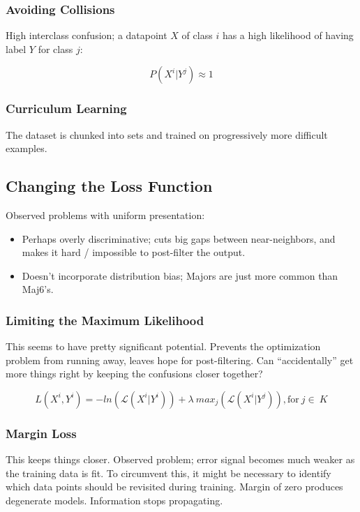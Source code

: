 \subsubsection{Avoiding Collisions}

High interclass confusion; a datapoint $X$ of class $i$ has a high likelihood of having label $Y$ for class $j$:

\begin{equation}
P(X^i | Y^j) \approx 1
\label{eq:collisions}
\end{equation}

\subsubsection{Curriculum Learning}
The dataset is chunked into sets and trained on progressively more difficult examples.

\subsection{Changing the Loss Function}

Observed problems with uniform presentation:
\begin{itemize}
\item Perhaps overly discriminative; cuts big gaps between near-neighbors, and makes it hard / impossible to post-filter the output.
\item Doesn't incorporate distribution bias; Majors are just more common than Maj6's.
\end{itemize}


\subsubsection{Limiting the Maximum Likelihood}

This seems to have pretty significant potential.
Prevents the optimization problem from running away, leaves hope for post-filtering.
Can ``accidentally'' get more things right by keeping the confusions closer together?

\begin{equation}
L(X^i, Y^i) = -ln(\mathcal{L}(X^i|Y^i)) + \lambda~max_j(\mathcal{L}(X^i|Y^j)), \text{for}~ j\in~K
\label{eq:collisions}
\end{equation}


\subsubsection{Margin Loss}
This keeps things closer.
Observed problem; error signal becomes much weaker as the training data is fit.
To circumvent this, it might be necessary to identify which data points should be revisited during training.
Margin of zero produces degenerate models. Information stops propagating.

